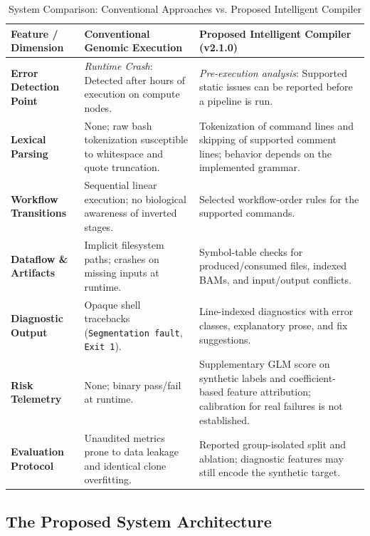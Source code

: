\documentclass[12pt,a4paper]{article}
\begin{document}
\begin{table}[H]
\centering
\footnotesize
\setlength{\tabcolsep}{4pt}
\renewcommand{\arraystretch}{1.15}
\caption{System Comparison: Conventional Approaches vs. Proposed Intelligent Compiler}
\label{tab:system_comparison}
\begin{tabularx}{\textwidth}{>{\raggedright\arraybackslash}p{2.8cm}>{\raggedright\arraybackslash}X>{\raggedright\arraybackslash}p{5.0cm}}
\toprule
\textbf{Feature / Dimension} & \textbf{Conventional Genomic Execution} & \textbf{Proposed Intelligent Compiler (v2.1.0)} \\
\midrule
\textbf{Error Detection Point} & \textit{Runtime Crash}: Detected after hours of execution on compute nodes. & \textit{Pre-execution analysis}: Supported static issues can be reported before a pipeline is run. \\
\addlinespace
\textbf{Lexical Parsing} & None; raw bash tokenization susceptible to whitespace and quote truncation. & Tokenization of command lines and skipping of supported comment lines; behavior depends on the implemented grammar. \\
\addlinespace
\textbf{Workflow Transitions} & Sequential linear execution; no biological awareness of inverted stages. & Selected workflow-order rules for the supported commands. \\
\addlinespace
\textbf{Dataflow \& Artifacts} & Implicit filesystem paths; crashes on missing inputs at runtime. & Symbol-table checks for produced/consumed files, indexed BAMs, and input/output conflicts. \\
\addlinespace
\textbf{Diagnostic Output} & Opaque shell tracebacks (\texttt{Segmentation fault}, \texttt{Exit 1}). & Line-indexed diagnostics with error classes, explanatory prose, and fix suggestions. \\
\addlinespace
\textbf{Risk Telemetry} & None; binary pass/fail at runtime. & Supplementary GLM score on synthetic labels and coefficient-based feature attribution; calibration for real failures is not established. \\
\addlinespace
\textbf{Evaluation Protocol} & Unaudited metrics prone to data leakage and identical clone overfitting. & Reported group-isolated split and ablation; diagnostic features may still encode the synthetic target. \\
\bottomrule
\end{tabularx}
\end{table}

\subsection{The Proposed System Architecture}
\end{document}
